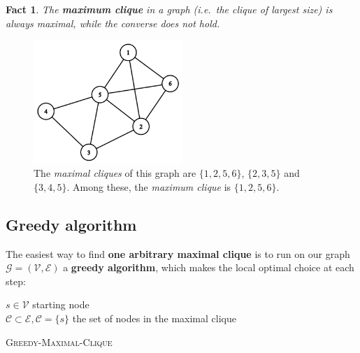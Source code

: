 \documentclass[11pt]{article}
\newtheorem*{fact}{Fact}
\begin{document}
\begin{fact}
The \textbf{maximum clique} in a graph (i.e.~the clique of largest size)
is always maximal, while the converse does not
hold\cite{maximal_clique}.
\end{fact}

\begin{figure}[h]
\centering
\includegraphics[width=0.5\textwidth]{img/ex_cliques.png}
\caption{The \emph{maximal cliques} of this graph are $\{1, 2, 5, 6\}$,
$\{2, 3, 5\}$ and $\{3, 4, 5\}$. Among these, the \emph{maximum clique} is
$\{1, 2, 5, 6\}$.}
\label{fig:cliques}
\end{figure}

\subsection{Greedy algorithm}\label{greedy-algorithm}

The easiest way to find \textbf{one arbitrary maximal clique} is to run
on our graph \(\mathcal{G}=(\mathcal{V}, \mathcal{E})\) a \textbf{greedy
algorithm}, which makes the local optimal choice at each step:

\begin{algorithm}[H]
\DontPrintSemicolon
\SetAlgoLined

  
  \BlankLine
  \BlankLine
  
  $s \in \mathcal{V}$ starting node
  \\$\mathcal{C} \subset \mathcal{E}, \mathcal{C} = \{s\}$ the set of nodes in the maximal clique
  \BlankLine
  
  
\caption{\textsc{Greedy-Maximal-Clique}}
\end{algorithm}
\end{document}
